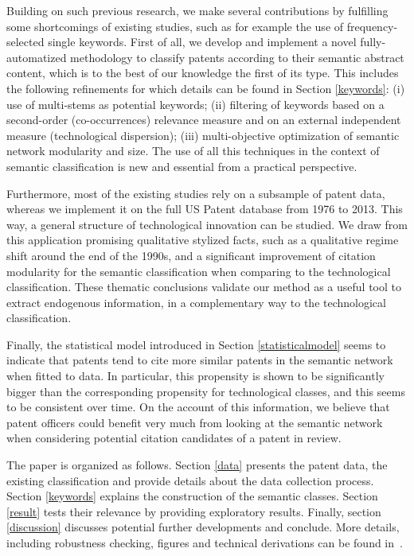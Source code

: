 \documentclass[12pt,twoside,a4paper]{article}
\begin{document}
Building on such previous research, we make several contributions by fulfilling some shortcomings of existing studies, such as for example the use of frequency-selected single keywords. First of all, we develop and implement a novel fully-automatized methodology to classify patents according to their semantic abstract content, which is to the best of our knowledge the first of its type. This includes the following refinements for which details can be found in Section \ref{keywords}: (i) use of multi-stems as potential keywords; (ii) filtering of keywords based on a second-order (co-occurrences) relevance measure and on an external independent measure (technological dispersion); (iii) multi-objective optimization of semantic network modularity and size. The use of all this techniques in the context of semantic classification is new and essential from a practical perspective. 

Furthermore, most of the existing studies rely on a subsample of patent data, whereas we implement it on the full US Patent database from 1976 to 2013. This way, a general structure of technological innovation can be studied. We draw from this application promising qualitative stylized facts, such as a qualitative regime shift around the end of the 1990s, and a significant improvement of citation modularity for the semantic classification when comparing to the technological classification. These thematic conclusions validate our method as a useful tool to extract endogenous information, in a complementary way to the technological classification.

Finally, the statistical model introduced in Section \ref{statisticalmodel} seems to indicate that patents tend to cite more similar patents in the semantic network  when fitted to data. In particular, this propensity is shown to be significantly bigger than the corresponding propensity for technological classes, and this seems to be consistent over time. On the account of this information, we believe that patent officers could benefit very much from looking at the semantic network when considering potential citation candidates of a patent in review.

The paper is organized as follows. Section \ref{data} presents the patent data, the existing classification and provide details about the data collection process. Section \ref{keywords} explains the construction of the semantic classes. Section \ref{result} tests their relevance by providing exploratory results. Finally, section \ref{discussion} discusses potential further developments and conclude. More details, including robustness checking, figures and technical derivations can be found in~.
\end{document}
